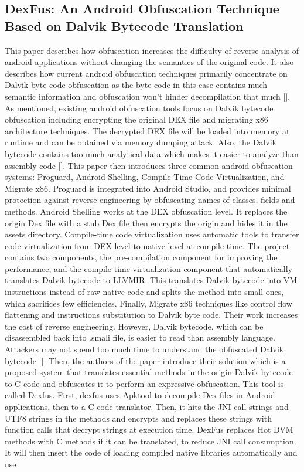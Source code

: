 \documentclass{article}
\begin{document}
\subsection{DexFus: An Android Obfuscation Technique Based on Dalvik Bytecode Translation}
This paper describes how obfuscation increases the difficulty of reverse analysis of android applications without changing the semantics of the original code. It also describes how current android obfuscation techniques primarily concentrate on Dalvik byte code obfuscation as the byte code in this case contains much semantic information and obfuscation won’t hinder decompilation that much [].
As mentioned, existing android obfuscation tools focus on Dalvik bytecode obfuscation including encrypting the original DEX file and migrating x86 architecture techniques. The decrypted DEX file will be loaded into memory at runtime and can be obtained via memory dumping attack. Also, the Dalvik bytecode contains too much analytical data which makes it easier to analyze than assembly code [].
This paper then introduces three common android obfuscation systems: Proguard, Android Shelling, Compile-Time Code Virtualization, and Migrate x86. Proguard is integrated into Android Studio, and provides minimal protection against reverse engineering by obfuscating names of classes, fields and methods. Android Shelling works at the DEX obfuscation level. It replaces the origin Dex file with a stub Dex file then encrypts the origin and hides it in the assets directory. Compile-time code virtualization uses automatic tools to transfer code virtualization from DEX level to native level at compile time. The project contains two components, the pre-compilation component for improving the performance, and the compile-time virtualization component that automatically translates Dalvik bytecode to LLVMIR. This translates Dalvik bytecode into VM instructions instead of raw native code and splits the method into small ones, which sacrifices few efficiencies. Finally, Migrate x86 techniques like control flow flattening and instructions substitution to Dalvik byte code. Their work increases the cost of reverse engineering. However, Dalvik bytecode, which can be disassembled back into .smali file, is easier to read than assembly language. Attackers may not spend too much time to understand the obfuscated Dalvik bytecode [].
Then, the authors of the paper introduce their solution which is a proposed system that translates essential methods in the origin Dalvik bytecode to C code and obfuscates it to perform an expressive obfuscation. This tool is called Dexfus. First, dexfus uses Apktool to decompile Dex files in Android applications, then to a C code translator. Then, it hits the JNI call strings and UTF8 strings in the methods and encrypts and replaces these strings with function calls that decrypt strings at execution time. DexFus replaces Hot DVM methods with C methods if it can be translated, to reduce JNI call consumption. It will then insert the code of loading compiled native libraries automatically and use
\end{document}
